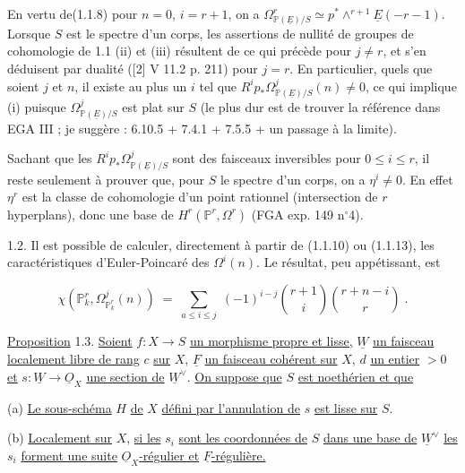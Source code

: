 En vertu de(1.1.8) pour $n = 0$, $i = r+1$, on a $\Omega^r_{\mathbb{P}(\underline{E})/S} \simeq p^* \wedge^{r+1} \underline{E}(-r-1)$. Lorsque $S$ est le spectre d'un corps, les assertions de nullité de groupes de cohomologie de 1.1 (ii) et (iii) résultent de ce qui précède pour $j \neq r$, et s'en déduisent par dualité ([2] V 11.2 p. 211) pour $j = r$. En particulier, quels que soient $j$ et $n$, il existe au plus un $i$ tel que $R^i p_* \Omega^j_{\mathbb{P}(\underline{E})/S}(n) \neq 0$, ce qui implique (i) puisque $\Omega^j_{\mathbb{P}(\underline{E})/S}$ est plat sur $S$ (le plus dur est de trouver la référence dans EGA III ; je suggère : 6.10.5 + 7.4.1 + 7.5.5 + un passage à la limite).

Sachant que les $R^i p_* \Omega^j_{\mathbb{P}(\underline{E})/S}$ sont des faisceaux inversibles pour $0 \leq i \leq r$, il reste seulement à prouver que, pour $S$ le spectre d'un corps, on a $\eta^i \neq 0$. En effet $\eta^r$ est la classe de cohomologie d'un point rationnel (intersection de $r$ hyperplans), donc une base de $H^r(\mathbb{P}^r,\Omega^r)$ (FGA exp. 149 n$^{\circ}$4).

1.2. Il est possible de calculer, directement à partir de (1.1.10) ou (1.1.13), les caractéristiques d'Euler-Poincaré des $\Omega^i(n)$. Le résultat, peu appétissant, est

\begin{equation*}
\chi(\mathbb{P}^r_k,\Omega^j_{\mathbb{P}^r_k}(n)) \;=\; \sum_{a \leq i \leq j} \; (-1)^{i-j} \binom{r+1}{i}\binom{r+n-i}{r} \; .
\end{equation*}


\underline{Proposition} 1.3. \underline{Soient} $f : X \longrightarrow S$ \underline{un morphisme propre et lisse,} $\underline{W}$ \underline{un faisceau localement libre de rang} $c$ \underline{sur} $X$, $\underline{F}$ \underline{un faisceau cohérent sur} $X$, $d$ \underline{un entier} $> 0$ \underline{et} $s : \underline{W} \longrightarrow \underline{O}_X$ \underline{une section de} $\underline{W}^{\vee}$. \underline{On suppose que} $S$ \underline{est noethérien et que}

(a) \underline{Le sous-schéma} $H$ \underline{de} $X$ \underline{défini par l'annulation de} $s$ \underline{est lisse sur} $S$.

(b) \underline{Localement sur} $X$, \underline{si les} $s_i$ \underline{sont les coordonnées de} $S$ \underline{dans une base de} $\underline{W}^{\vee}$ \underline{les} $s_i$ \underline{forment une suite} $\underline{O}_X$\underline{-régulier et} $\underline{F}$\underline{-régulière.}

